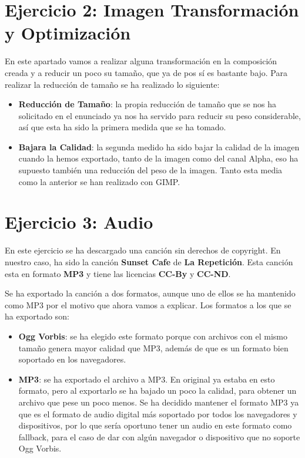 \section{Ejercicio 2: Imagen Transformación y Optimización}
En este apartado vamos a realizar alguna transformación en la composición creada y a reducir un poco su tamaño, que ya de pos sí es bastante bajo. Para realizar la reducción de tamaño se ha realizado lo siguiente:

\begin{itemize}
    \item \textbf{Reducción de Tamaño}: la propia reducción de tamaño que se nos ha solicitado en el enunciado ya nos ha servido para reducir su peso considerable, así que esta ha sido la primera medida que se ha tomado.
    \item \textbf{Bajara la Calidad}: la segunda medido ha sido bajar la calidad de la imagen cuando la hemos exportado, tanto de la imagen como del canal Alpha, eso ha supuesto también una reducción del peso de la imagen. Tanto esta media como la anterior se han realizado con GIMP.
\end{itemize}

\section{Ejercicio 3: Audio}
En este ejercicio se ha descargado una canción sin derechos de copyright. En nuestro caso, ha sido la canción \textbf{Sunset Cafe} de \textbf{La Repetición}. Esta canción esta en formato \textbf{MP3} y tiene las licencias \textbf{CC-By} y \textbf{CC-ND}.

Se ha exportado la canción a dos formatos, aunque uno de ellos se ha mantenido como MP3 por el motivo que ahora vamos a explicar. Los formatos a los que se ha exportado son:

\begin{itemize}
    \item \textbf{Ogg Vorbis}: se ha elegido este formato porque con archivos con el mismo tamaño genera mayor calidad que MP3, además de que es un formato bien soportado en los navegadores.

    \item \textbf{MP3}: se ha exportado el archivo a MP3. En original ya estaba en esto formato, pero al exportarlo se ha bajado un poco la calidad, para obtener un archivo que pese un poco menos. Se ha decidido mantener el formato MP3 ya que es el formato de audio digital más soportado por todos los navegadores y dispositivos, por lo que sería oportuno tener un audio en este formato como fallback, para el caso de dar con algún navegador o dispositivo que no soporte Ogg Vorbis.
\end{itemize}

